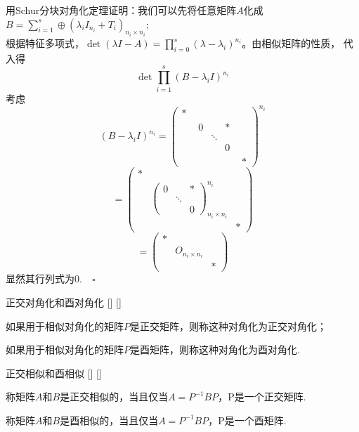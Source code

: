 \documentclass[UTF8]{ctexart}
\begin{document}
		\begin{prf}
			用Schur分块对角化定理证明：我们可以先将任意矩阵$A$化成$B=\sum_{i=1}^{s}\oplus (\lambda_iI_{n_i}+T_i)_{n_i\times n_i}$;\\
			根据特征多项式，$\det(\lambda I-A)=\prod_{i=0}^{s}(\lambda-\lambda_i)^{n_i}$。由相似矩阵的性质，
			代入得\begin{displaymath}
				\det\prod_{i=1}^{s}\left(B-\lambda_iI\right)^{n_i} 
			\end{displaymath}
			考虑\[
				\left(B-\lambda_iI\right)^{n_i}=\begin{pmatrix}
					*&&\\ &\begin{matrix}
						0&&*\\ &\ddots&\\ &&0
					\end{matrix}&\\ &&*
				\end{pmatrix}^{n_i}\]
				\[=\begin{pmatrix}
					*&&\\ &\begin{pmatrix}
						0&&*\\ &\ddots&\\ &&0
					\end{pmatrix}^{n_i}_{n_i\times n_i}&\\ &&*
				\end{pmatrix}\]
                \[=\begin{pmatrix}
					*&&\\ &O_{n_i\times n_i}&\\ &&*
				\end{pmatrix}
			\]
			显然其行列式为0.$\quad\square$
		\end{prf}

		\begin{dfn}
			[]
			{正交对角化和酉对角化}
			[]
			[]

			如果用于相似对角化的矩阵$P$是正交矩阵，则称这种对角化为正交对角化；

			如果用于相似对角化的矩阵$P$是酉矩阵，则称这种对角化为酉对角化.
		\end{dfn}
		
		\begin{dfn}
			[]
			{正交相似和酉相似}
			[]
			[]

			称矩阵$A$和$B$是正交相似的，当且仅当$A=P^{-1}BP$，P是一个正交矩阵.

			称矩阵$A$和$B$是酉相似的，当且仅当$A=P^{-1}BP$，P是一个酉矩阵.
		\end{dfn}
\end{document}
